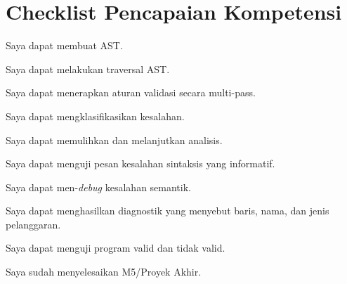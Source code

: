 \section*{Checklist Pencapaian Kompetensi}

\begin{checklist}
  \item Saya dapat membuat AST.
  \item Saya dapat melakukan traversal AST.
  \item Saya dapat menerapkan aturan validasi secara multi-pass.
  \item Saya dapat mengklasifikasikan kesalahan.
  \item Saya dapat memulihkan dan melanjutkan analisis.
  \item Saya dapat menguji pesan kesalahan sintaksis yang informatif.
  \item Saya dapat men-\textit{debug} kesalahan semantik.
  \item Saya dapat menghasilkan diagnostik yang menyebut baris, nama,
        dan jenis pelanggaran.
  \item Saya dapat menguji program valid dan tidak valid.
  \item Saya sudah menyelesaikan M5/Proyek Akhir.
\end{checklist}
